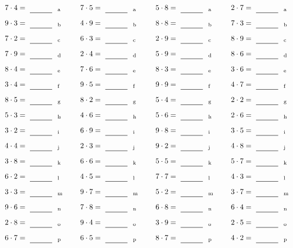 \documentclass
[
  draft    = true,
  fontsize = 11pt,
  parskip  = half-
]
{scrartcl}
\begin{document}
\par\vfill\par
\begin{align*}
    \pline{7\cdot4}&=\rline{a}
  & \pline{7\cdot5}&=\rline{a}
  & \pline{5\cdot8}&=\rline{a}
  & \pline{2\cdot7}&=\rline{a} \\[1ex]
    \pline{9\cdot3}&=\rline{b}
  & \pline{4\cdot9}&=\rline{b}
  & \pline{8\cdot8}&=\rline{b}
  & \pline{7\cdot3}&=\rline{b} \\[1ex]
    \pline{7\cdot2}&=\rline{c}
  & \pline{6\cdot3}&=\rline{c}
  & \pline{2\cdot9}&=\rline{c}
  & \pline{8\cdot9}&=\rline{c} \\[1ex]
    \pline{7\cdot9}&=\rline{d}
  & \pline{2\cdot4}&=\rline{d}
  & \pline{5\cdot9}&=\rline{d}
  & \pline{8\cdot6}&=\rline{d} \\[1ex]
    \pline{8\cdot4}&=\rline{e}
  & \pline{7\cdot6}&=\rline{e}
  & \pline{8\cdot3}&=\rline{e}
  & \pline{3\cdot6}&=\rline{e} \\[1ex]
    \pline{3\cdot4}&=\rline{f}
  & \pline{9\cdot5}&=\rline{f}
  & \pline{9\cdot9}&=\rline{f}
  & \pline{4\cdot7}&=\rline{f} \\[1ex]
    \pline{8\cdot5}&=\rline{g}
  & \pline{8\cdot2}&=\rline{g}
  & \pline{5\cdot4}&=\rline{g}
  & \pline{2\cdot2}&=\rline{g} \\[1ex]
    \pline{5\cdot3}&=\rline{h}
  & \pline{4\cdot6}&=\rline{h}
  & \pline{5\cdot6}&=\rline{h}
  & \pline{2\cdot6}&=\rline{h} \\[1ex]
    \pline{3\cdot2}&=\rline{i}
  & \pline{6\cdot9}&=\rline{i}
  & \pline{9\cdot8}&=\rline{i}
  & \pline{3\cdot5}&=\rline{i} \\[1ex]
    \pline{4\cdot4}&=\rline{j}
  & \pline{2\cdot3}&=\rline{j}
  & \pline{9\cdot2}&=\rline{j}
  & \pline{4\cdot8}&=\rline{j} \\[1ex]
    \pline{3\cdot8}&=\rline{k}
  & \pline{6\cdot6}&=\rline{k}
  & \pline{5\cdot5}&=\rline{k}
  & \pline{5\cdot7}&=\rline{k} \\[1ex]
    \pline{6\cdot2}&=\rline{l}
  & \pline{4\cdot5}&=\rline{l}
  & \pline{7\cdot7}&=\rline{l}
  & \pline{4\cdot3}&=\rline{l} \\[1ex]
    \pline{3\cdot3}&=\rline{m}
  & \pline{9\cdot7}&=\rline{m}
  & \pline{5\cdot2}&=\rline{m}
  & \pline{3\cdot7}&=\rline{m} \\[1ex]
    \pline{9\cdot6}&=\rline{n}
  & \pline{7\cdot8}&=\rline{n}
  & \pline{6\cdot8}&=\rline{n}
  & \pline{6\cdot4}&=\rline{n} \\[1ex]
    \pline{2\cdot8}&=\rline{o}
  & \pline{9\cdot4}&=\rline{o}
  & \pline{3\cdot9}&=\rline{o}
  & \pline{2\cdot5}&=\rline{o} \\[1ex]
    \pline{6\cdot7}&=\rline{p}
  & \pline{6\cdot5}&=\rline{p}
  & \pline{8\cdot7}&=\rline{p}
  & \pline{4\cdot2}&=\rline{p}
\end{align*}
\end{document}
